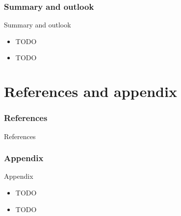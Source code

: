 \documentclass[xcolor=dvipsnames]{beamer}
\begin{document}
\section{Summary and outlook}

\begin{frame}{Summary and outlook}
	\begin{itemize}
		\item TODO
		\item TODO
	\end{itemize}
\end{frame}




\part{References and appendix}


\section{References}

\begin{frame}[allowframebreaks, t]{References}
	\footnotesize
	
	
\end{frame}


\section{Appendix}

\begin{frame}[allowframebreaks]{Appendix}
	\begin{itemize}
		\item TODO
		\item TODO
	\end{itemize}
\end{frame}
\end{document}
